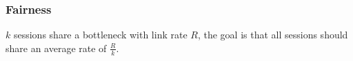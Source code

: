 \subsubsection{Fairness}

$k$ sessions share a bottleneck with link rate $R$, the goal is that all
sessions should share an average rate of $\frac{R}{k}$.